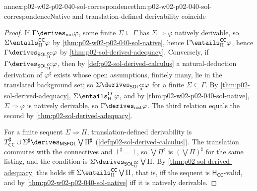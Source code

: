 \begin{annexitem}{annex:p02-w02-p02-040-sol-correspondence}{thm:p02-w02-p02-040-sol-correspondence}{Native and translation-defined derivability coincide}
\begin{proof}
If \(\Gamma\derives_{\mathrm{nat}}\varphi\), some finite \(\Sigma\subseteq\Gamma\)
has \(\Sigma\Rightarrow\varphi\) natively derivable, so
\(\Sigma\entails_{\mathrm H}^{\mathsf{CC}}\varphi\) by
\cref{thm:p02-w02-p02-040-sol-native}, hence
\(\Gamma\entails_{\mathrm H}^{\mathsf{CC}}\varphi\), hence
\(\Gamma\derives_{\mathsf{SOL}_{\mathrm H}^{\mathsf{CC}}}\varphi\) by
\cref{thm:p02-sol-derived-adequacy}.  Conversely, if
\(\Gamma\derives_{\mathsf{SOL}_{\mathrm H}^{\mathsf{CC}}}\varphi\), then by
\cref{def:p02-sol-derived-calculus} a natural-deduction derivation of
\(\varphi^\sharp\) exists whose open assumptions, finitely many, lie in the
translated background set; so
\(\Sigma\derives_{\mathsf{SOL}_{\mathrm H}^{\mathsf{CC}}}\varphi\) for a finite
\(\Sigma\subseteq\Gamma\).  By \cref{thm:p02-sol-derived-adequacy},
\(\Sigma\entails_{\mathrm H}^{\mathsf{CC}}\varphi\), and by
\cref{thm:p02-w02-p02-040-sol-native}, \(\Sigma\Rightarrow\varphi\) is natively
derivable, so \(\Gamma\derives_{\mathrm{nat}}\varphi\).  The third relation equals
the second by \cref{thm:p02-sol-derived-adequacy}.

For a finite sequent \(\Sigma\Rightarrow\Pi\), translation-defined
derivability is
\(T^\sharp_{\mathsf{CC}}\cup\Sigma^\sharp\derives_{\mathsf{MSFOL}}\bigvee\Pi^\sharp\)
(\cref{def:p02-sol-derived-calculus}).  The translation commutes with the
connectives and \(\bot^\sharp=\bot\), so \(\bigvee\Pi^\sharp\) is
\((\bigvee\Pi)^\sharp\) for the same listing, and the condition is
\(\Sigma\derives_{\mathsf{SOL}_{\mathrm H}^{\mathsf{CC}}}\bigvee\Pi\).  By
\cref{thm:p02-sol-derived-adequacy} this holds iff
\(\Sigma\entails_{\mathrm H}^{\mathsf{CC}}\bigvee\Pi\), that is, iff the sequent is
\(\mathsf H_{\mathsf{CC}}\)-valid, and by \cref{thm:p02-w02-p02-040-sol-native}
iff it is natively derivable.
\end{proof}
\end{annexitem}


